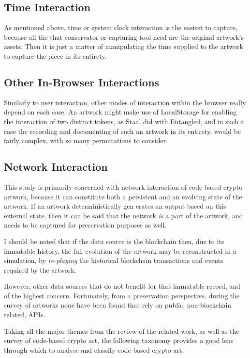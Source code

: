 \subsection{Time Interaction}

As mentioned above, time or system clock interaction is the easiest to capture, because all the that conservator or capturing tool need are the original artwork's assets. Then it is just a matter of manipulating the time supplied to the artwork to capture the piece in its entirety.

\subsection{Other In-Browser Interactions}

Similarly to user interaction, other modes of interaction within the browser really depend on each case. An artwork might make use of LocalStorage for enabling the interaction of two distinct tokens, as Staal did with Entangled, and in such a case the recording and documenting of such an artwork in its entirety, would be fairly complex, with so many permutations to consider.

\subsection{Network Interaction}

This study is primarily concerned with network interaction of code-based crypto artwork, because it can constitute both a persistent and an evolving state of the artwork. If an artwork deterministically gen	erates an output based on this external state, then it can be said that the network \emph{is} a part of the artwork, and needs to be captured for preservation purposes as well.

I should be noted that if the data source is the blockchain then, due to its immutable history, the full evolution of the artwork may be reconstructed in a simulation, by \emph{re-playing} the historical blockchain transactions and events required by the artwork.

However, other data sources that do not benefit for that immutable record, and of the highest concern. Fortunately, from a preservation perspective,  during the survey of artworks none have been found that rely on public, non-blockchain related, APIs.

\clearpage

Taking all the major themes from the review of the related work, as well as the survey of code-based crypto art, the following taxonomy provides a good lens through which to analyse and classify code-based crypto art.

